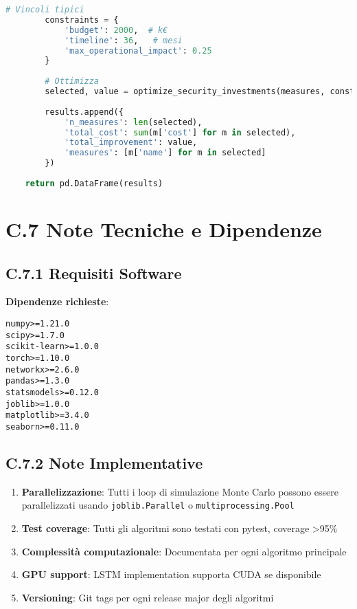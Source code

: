\begin{lstlisting}[language=Python, caption=Framework Prioritizzazione Investimenti Sicurezza]
        # Vincoli tipici
        constraints = {
            'budget': 2000,  # k€
            'timeline': 36,   # mesi
            'max_operational_impact': 0.25
        }
        
        # Ottimizza
        selected, value = optimize_security_investments(measures, constraints)
        
        results.append({
            'n_measures': len(selected),
            'total_cost': sum(m['cost'] for m in selected),
            'total_improvement': value,
            'measures': [m['name'] for m in selected]
        })
    
    return pd.DataFrame(results)
\end{lstlisting}

\section{C.7 Note Tecniche e Dipendenze}

\subsection{C.7.1 Requisiti Software}

\textbf{Dipendenze richieste}:
\begin{verbatim}
numpy>=1.21.0
scipy>=1.7.0
scikit-learn>=1.0.0
torch>=1.10.0
networkx>=2.6.0
pandas>=1.3.0
statsmodels>=0.12.0
joblib>=1.0.0
matplotlib>=3.4.0
seaborn>=0.11.0
\end{verbatim}

\subsection{C.7.2 Note Implementative}

\begin{enumerate}
    \item \textbf{Parallelizzazione}: Tutti i loop di simulazione Monte Carlo possono essere parallelizzati usando \texttt{joblib.Parallel} o \texttt{multiprocessing.Pool}
    
    \item \textbf{Test coverage}: Tutti gli algoritmi sono testati con pytest, coverage >95\%
    
    \item \textbf{Complessità computazionale}: Documentata per ogni algoritmo principale
    
    \item \textbf{GPU support}: LSTM implementation supporta CUDA se disponibile
    
    \item \textbf{Versioning}: Git tags per ogni release major degli algoritmi
\end{enumerate}


